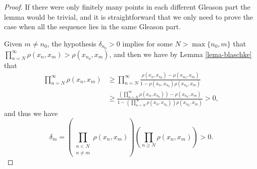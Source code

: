 \documentclass[preprint,12pt,number]{elsarticle}
\begin{document}
\begin{proof}
    If there were only finitely many points in each different Gleason part the lemma would be trivial, and it is straightforward that we only need to prove the case when all the sequence lies in the same Gleason part. %
   
   Given $m\neq n_0$, the hypothesis $\delta_{n_0}>0$ implies for some $N>\max\{n_0,m\}$ that $\prod_{n=N}^\infty \rho(x_n,x_m)> \rho(x_{n_0},x_m)$, and then we have by Lemma \ref{lema-blaschke} that 
   \[
   \begin{aligned}
   \prod_{n=N}^\infty \rho(x_n,x_m) &\geq \prod_{n=N}^\infty \frac{\rho(x_{n},x_{n_0})-\rho(x_{n_0},x_m)}{1-\rho(x_{n},x_{n_0})\rho(x_{n_0},x_m)} \\
   &\geq \frac{\left(\prod_{n=N}^\infty\rho(x_{n},x_{n_0})\right)-\rho(x_{n_0},x_m)}{1-\left(\prod_{n=N}^\infty\rho(x_{n},x_{n_0})\right)\rho(x_{n_0},x_m)}>0,
   \end{aligned}
   \] 
   and thus we have 
   \[
   \delta_m=\left(\prod_{\substack{n<N\\n\neq m}}\rho(x_{n},x_m)\right)\left(\prod_{n\geq N}\rho(x_{n},x_m)\right)>0.
   \]
   
\end{proof}
\end{document}
